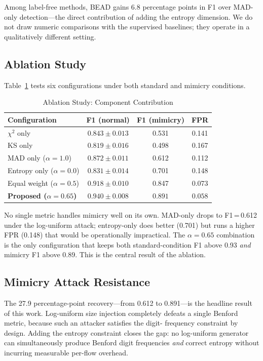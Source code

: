 \documentclass[conference]{IEEEtran}
\begin{document}
Among label-free methods, BEAD gains 6.8 percentage points in F1 over
MAD-only detection—the direct contribution of adding the entropy
dimension. We do not draw numeric comparisons with the supervised
baselines; they operate in a qualitatively different setting.

\subsection{Ablation Study}
\label{sec:ablation}

Table~\ref{tab:ablation} tests six configurations under both standard
and mimicry conditions.

\begin{table}[t]
\caption{Ablation Study: Component Contribution}
\label{tab:ablation}
\centering
\setlength{\tabcolsep}{4pt}
\begin{tabular}{lccc}
\toprule
\textbf{Configuration} & \textbf{F1 (normal)} & \textbf{F1 (mimicry)} & \textbf{FPR} \\
\midrule
$\chi^2$ only              & $0.843{\pm}0.013$ & 0.531 & 0.141 \\
KS only                    & $0.819{\pm}0.016$ & 0.498 & 0.167 \\
MAD only ($\alpha=1.0$)    & $0.872{\pm}0.011$ & 0.612 & 0.112 \\
Entropy only ($\alpha=0.0$)& $0.831{\pm}0.014$ & 0.701 & 0.148 \\
Equal weight ($\alpha=0.5$)& $0.918{\pm}0.010$ & 0.847 & 0.073 \\
\textbf{Proposed ($\alpha=0.65$)} & $\mathbf{0.940{\pm}0.008}$ & $\mathbf{0.891}$ & $\mathbf{0.058}$ \\
\bottomrule
\end{tabular}
\end{table}

No single metric handles mimicry well on its own. MAD-only drops to
F1\,=\,0.612 under the log-uniform attack; entropy-only does better
(0.701) but runs a higher FPR (0.148) that would be operationally
impractical. The $\alpha=0.65$ combination is the only configuration
that keeps both standard-condition F1 above 0.93 \emph{and} mimicry F1
above 0.89. This is the central result of the ablation.

\subsection{Mimicry Attack Resistance}

The 27.9 percentage-point recovery—from 0.612 to 0.891—is the headline
result of this work. Log-uniform size injection completely defeats a
single Benford metric, because such an attacker satisfies the digit-
frequency constraint by design. Adding the entropy constraint closes the
gap: no log-uniform generator can simultaneously produce Benford digit
frequencies \emph{and} correct entropy without incurring measurable
per-flow overhead.
\end{document}
